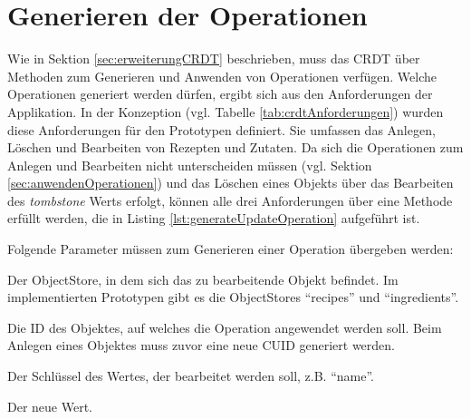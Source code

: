 \documentclass[a4paper, 12pt]{scrreprt}
\begin{document}
\begin{minipage}{\linewidth}
	
\end{minipage}

\section{Generieren der Operationen}

Wie in Sektion \ref{sec:erweiterungCRDT} beschrieben, muss das CRDT über Methoden zum Generieren und Anwenden von Operationen verfügen. Welche Operationen generiert werden dürfen, ergibt sich aus den Anforderungen der Applikation. In der Konzeption (vgl. Tabelle \ref{tab:crdtAnforderungen}) wurden diese Anforderungen für den Prototypen definiert. Sie umfassen das Anlegen, Löschen und Bearbeiten von Rezepten und Zutaten. Da sich die Operationen zum Anlegen und Bearbeiten nicht unterscheiden müssen (vgl. Sektion \ref{sec:anwendenOperationen}) und das Löschen eines Objekts über das Bearbeiten des \textit{tombstone} Werts erfolgt, können alle drei Anforderungen über eine Methode erfüllt werden, die in Listing \ref{lst:generateUpdateOperation} aufgeführt ist. 

\begin{minipage}{\linewidth}
	
\end{minipage}

Folgende Parameter müssen zum Generieren einer Operation übergeben werden: 
\begin{description}[leftmargin=!,labelwidth=\widthof{\bfseries store: }]
	\item [\textit{store:} ] Der ObjectStore, in dem sich das zu bearbeitende Objekt befindet. Im implementierten Prototypen gibt es die ObjectStores \enquote{recipes} und \enquote{ingredients}.
	\item [\textit{Id:} ] Die ID des Objektes, auf welches die Operation angewendet werden soll. Beim Anlegen eines Objektes muss zuvor eine neue CUID generiert werden.
	\item [\textit{key:} ] Der Schlüssel des Wertes, der bearbeitet werden soll, z.B. \enquote{name}.
	\item [\textit{value:} ] Der neue Wert.
\end{description}
\end{document}
